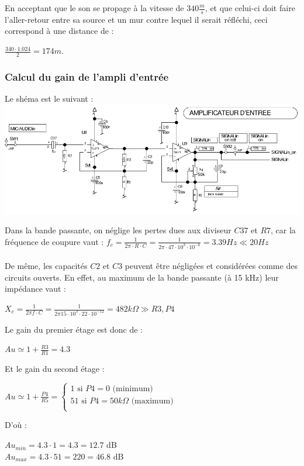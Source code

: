 \documentclass{article}
\begin{document}
En acceptant que le son se propage à la vitesse de $340 \frac{m}{s}$, et que celui-ci doit faire l'aller-retour entre sa source et un mur contre lequel il serait réfléchi, ceci correspond à une distance de :\\
\begin{center}
$\frac{340 \cdot 1.024}{2} = 174m$.
\end{center}

\subsubsection{Calcul du gain de l'ampli d'entrée}
Le shéma est le suivant :\\
\includegraphics[width = 0.9\linewidth]{shema_echo_entree.png}

Dans la bande passante, on néglige les pertes dues aux diviseur $C37$ et $R7$, car la fréquence de coupure vaut :
$f_c = \frac{1}{2 \pi \cdot R \cdot C} = \frac{1}{2 \pi \cdot 47 \cdot 10^3 \cdot 10^{-6}} = 3.39 Hz \ll 20 Hz$
\\\\
De même, les capacités $C2$ et $C3$ peuvent être négligées et considérées comme des circuits ouverts.
En effet, au maximum de la bande passante (à 15 kHz) leur impédance vaut :
\begin{center}$X_c = \frac{1}{2 \pi f \cdot C} = \frac{1}{2 \pi 15 \cdot 10^3 \cdot 22 \cdot 10^{-12}} = 482 k\Omega \gg R3, P4 $\end{center}
Le gain du premier étage est donc de :
\begin{center}
$Au \simeq 1+\frac{R3}{R1} = 4.3 $
\end{center}
Et le gain du second étage :
\begin{center}
$Au \simeq 1+\frac{P4}{R5} =
\left\{
  \begin{array}{rcr}
    1 \mbox{ si } P4 = 0 \mbox{ (minimum)} \\
    51 \mbox{ si } P4 = 50k\Omega \mbox{ (maximum)} \\
  \end{array}
\right.
$
\end{center}
D'où :
\begin{center}
$Au_{min} = 4.3 \cdot 1 = 4.3  = 12.7$ dB\\
$ Au_{max} = 4.3 \cdot 51 = 220 = 46.8$ dB
\end{center}
\end{document}
